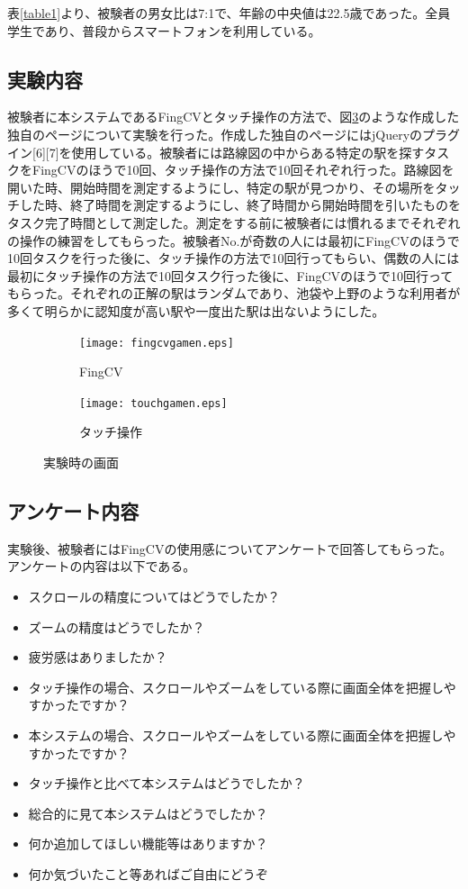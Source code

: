 \documentclass[11pt,a4j, titlepage]{jarticle} %
\begin{document}
表\ref{table1}より、被験者の男女比は7:1で、年齢の中央値は22.5歳であった。全員学生であり、普段からスマートフォンを利用している。

\subsection{実験内容}
被験者に本システムであるFingCVとタッチ操作の方法で、図\ref{fig:f24}のような作成した独自のページについて実験を行った。作成した独自のページにはjQueryのプラグイン[6][7]を使用している。被験者には路線図の中からある特定の駅を探すタスクをFingCVのほうで10回、タッチ操作の方法で10回それぞれ行った。路線図を開いた時、開始時間を測定するようにし、特定の駅が見つかり、その場所をタッチした時、終了時間を測定するようにし、終了時間から開始時間を引いたものをタスク完了時間として測定した。測定をする前に被験者には慣れるまでそれぞれの操作の練習をしてもらった。被験者No.が奇数の人には最初にFingCVのほうで10回タスクを行った後に、タッチ操作の方法で10回行ってもらい、偶数の人には最初にタッチ操作の方法で10回タスク行った後に、FingCVのほうで10回行ってもらった。それぞれの正解の駅はランダムであり、池袋や上野のような利用者が多くて明らかに認知度が高い駅や一度出た駅は出ないようにした。

\begin{figure}[H]
	\centering
	\begin{subfigure}{0.4\columnwidth}
		\centering
		\texttt{[image: fingcvgamen.eps]}
		\caption{FingCV}
		\label{fig:fingcvgamen}
	\end{subfigure}
	\begin{subfigure}{0.4\columnwidth}
		\centering
		\texttt{[image: touchgamen.eps]}
		\caption{タッチ操作}
		\label{fig:touchgamen}
	\end{subfigure}
	\caption{実験時の画面}
	\label{fig:f24}
\end{figure}

\subsection{アンケート内容}
実験後、被験者にはFingCVの使用感についてアンケートで回答してもらった。アンケートの内容は以下である。

\begin{itemize}
	\item スクロールの精度についてはどうでしたか？
	\item ズームの精度はどうでしたか？
	\item 疲労感はありましたか？
	\item タッチ操作の場合、スクロールやズームをしている際に画面全体を把握しやすかったですか？
	\item 本システムの場合、スクロールやズームをしている際に画面全体を把握しやすかったですか？
	\item タッチ操作と比べて本システムはどうでしたか？
	\item 総合的に見て本システムはどうでしたか？
	\item 何か追加してほしい機能等はありますか？
	\item 何か気づいたこと等あればご自由にどうぞ
\end{itemize}
\end{document}
